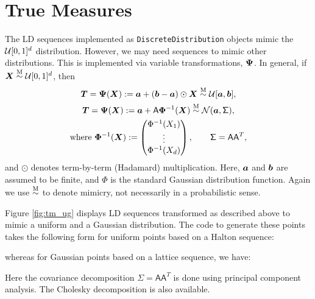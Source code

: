 \documentclass[graybox,footinfo]{svmult}
\newcommand{\Msim}{\overset{\textup{M}}{\sim}}
\newcommand{\mA}{\mathsf{A}}
\newcommand{\mSigma}{\mathsf{\Sigma}}
\begin{document}
\section{True Measures}

The LD sequences implemented as \texttt{DiscreteDistribution} objects mimic the ${\mathcal{U}}[0,1]^d$ distribution.  However, we may need sequences to mimic other distributions.  This is implemented via variable transformations, ${\boldsymbol{\Psi}}$.  In general, if $\bsX \Msim \calU[0,1]^d$, then
\begin{subequations} \label{eq:exampleVarTrans}
\begin{gather}
\bsT = \bsPsi(\bsX) := \bsa  + (\bsb - \bsa) \odot \bsX \Msim  \calU[\bsa,\bsb], \\
\label{eq:exampleVarTransGauss}
\bsT = \bsPsi(\bsX) := \bsa + \mA \bsPhi^{-1}(\bsX)  \Msim \calN(\bsa, \mSigma), \\
\nonumber  \text{where }  \bsPhi^{-1}(\bsX) : = \begin{pmatrix} \Phi^{-1}(X_1) \\ \vdots \\ \Phi^{-1}(X_d)\end{pmatrix}, \qquad \mSigma = \mA \mA^T,
\end{gather}
\end{subequations}
and $\odot$ denotes term-by-term (Hadamard) multiplication.  Here, ${\boldsymbol{a}}$ and ${\boldsymbol{b}}$ are assumed to be finite, and $\Phi$ is the standard Gaussian distribution function.  Again we use $\Msim$ to denote mimicry, not necessarily in a probabilistic sense.

Figure \ref{fig:tm_ug} displays LD sequences transformed as described above to mimic a uniform and a Gaussian distribution.  The code to generate these points takes the following form for uniform points based on a Halton sequence: 

whereas for Gaussian points based on a lattice sequence, we have:

Here the covariance decomposition $\mSigma = \mA \mA^T$ is done using principal component analysis. The Cholesky decomposition is also available.
\end{document}
